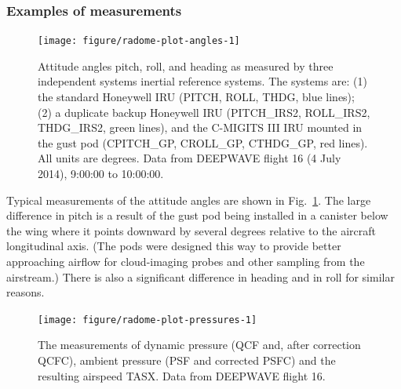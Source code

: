 \documentclass[12pt,twoside,english]{article}\usepackage[]{graphicx}\usepackage[]{color}
\newenvironment{knitrout}{}{} %
\let\OrgIndex\index
\renewcommand*{\index}[1]{\OrgIndex{#1}}
\begin{document}
\subsubsection{Examples of measurements}

\begin{knitrout}
\color{fgcolor}\begin{figure}
\texttt{[image: figure/radome-plot-angles-1]} \caption[Attitude angles pitch, roll, and heading as measured by three independent systems inertial reference systems]{Attitude angles pitch, roll, and heading as measured by three independent systems inertial reference systems. The systems are: (1) the standard Honeywell IRU (PITCH, ROLL, THDG, blue lines); (2) a duplicate backup Honeywell IRU (PITCH\_IRS2, ROLL\_IRS2, THDG\_IRS2, green lines), and the C-MIGITS III IRU mounted in the gust pod (CPITCH\_GP, CROLL\_GP, CTHDG\_GP, red lines). All units are degrees. Data from DEEPWAVE flight 16 (4 July 2014), 9:00:00 to 10:00:00.}\label{fig:radome-plot-angles}
\end{figure}


\end{knitrout}

Typical measurements  of the attitude angles are shown in Fig.~\ref{fig:radome-plot-angles}. The large difference in pitch is a result of the gust pod being installed in a canister below the wing where it points downward by several degrees relative to the aircraft longitudinal axis. (The pods were designed this way to provide better approaching airflow for cloud-imaging probes and other sampling from the airstream.) There is also a significant difference in heading and in roll for similar reasons. 

\begin{knitrout}
\color{fgcolor}\begin{figure}
\texttt{[image: figure/radome-plot-pressures-1]} \caption[The measurements of dynamic pressure (QCF and, after correction QCFC), ambient pressure (PSF and corrected PSFC) and the resulting airspeed TASX]{The measurements of dynamic pressure (QCF and, after correction QCFC), ambient pressure (PSF and corrected PSFC) and the resulting airspeed TASX. Data from DEEPWAVE flight 16.}\label{fig:radome-plot-pressures}
\end{figure}


\end{knitrout}
\end{document}
